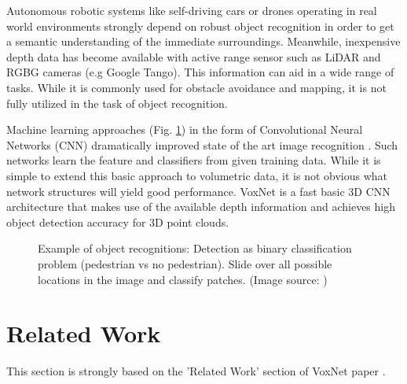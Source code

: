 \documentclass[10pt,twocolumn,letterpaper]{article}
\begin{document}
Autonomous robotic systems like self-driving cars or drones operating in real world environments strongly depend on robust object recognition
in order to get a semantic understanding of the immediate surroundings.
Meanwhile, inexpensive depth data has become available with active range sensor such as LiDAR and RGBG cameras (e.g Google Tango). 
This information can aid in a wide range of tasks. While it is commonly used for obstacle avoidance and mapping, it is not fully 
utilized in the task of object recognition.


Machine learning approaches (Fig. \ref{fig:obj_rec}) in the form of Convolutional Neural Networks (CNN) dramatically improved state 
of the art image recognition \cite{krizhevsky2012imagenet}. Such networks learn the feature and classifiers from given training data.
While it is simple to extend this basic approach to volumetric data, it is not obvious what network structures will yield good performance.
VoxNet \cite{voxnet} is a fast basic 3D CNN architecture that makes use of the available depth information and achieves high object detection accuracy for 
3D point clouds.


\begin{figure}[h]
	\label{fig:obj_rec}
	\centering
	\caption{Example of object recognitions: Detection as binary classification problem (pedestrian vs no pedestrian). Slide over all possible locations in the image and classify patches. 
	  (Image source: \cite{udacity})}
\end{figure}


\section{Related Work}

This section is strongly based on the 'Related Work' section of VoxNet paper \cite{voxnet}.
\end{document}
